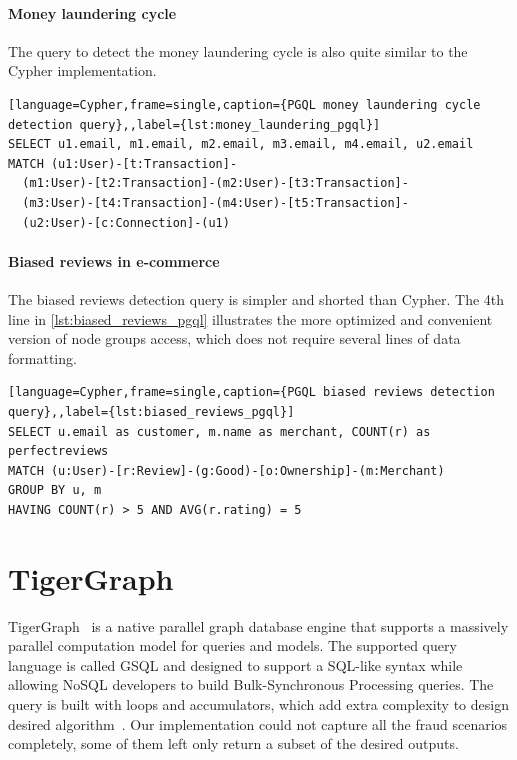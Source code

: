 \paragraph{Money laundering cycle}

The query to detect the money laundering cycle is also quite similar to the Cypher implementation.

\begin{lstlisting}[language=Cypher,frame=single,caption={PGQL money laundering cycle detection query},,label={lst:money_laundering_pgql}]
SELECT u1.email, m1.email, m2.email, m3.email, m4.email, u2.email
MATCH (u1:User)-[t:Transaction]-
  (m1:User)-[t2:Transaction]-(m2:User)-[t3:Transaction]-
  (m3:User)-[t4:Transaction]-(m4:User)-[t5:Transaction]-
  (u2:User)-[c:Connection]-(u1)
\end{lstlisting}

\paragraph{Biased reviews in e-commerce}

The biased reviews detection query is simpler and shorted than Cypher.
The 4th line in \autoref{lst:biased_reviews_pgql} illustrates the more optimized and convenient version of node groups access, which does not require several lines of data formatting.

\begin{lstlisting}[language=Cypher,frame=single,caption={PGQL biased reviews detection query},,label={lst:biased_reviews_pgql}]
SELECT u.email as customer, m.name as merchant, COUNT(r) as perfectreviews
MATCH (u:User)-[r:Review]-(g:Good)-[o:Ownership]-(m:Merchant)
GROUP BY u, m
HAVING COUNT(r) > 5 AND AVG(r.rating) = 5
\end{lstlisting}

\section{TigerGraph}\label{sec:static_tigergrap_implementation}

TigerGraph~\cite{tigergraph_website} is a native parallel graph database engine that supports a massively parallel computation model for queries and models.
The supported query language is called GSQL and designed to support a SQL-like syntax while allowing NoSQL developers to build Bulk-Synchronous Processing queries.
The query is built with loops and accumulators, which add extra complexity to design desired algorithm~\cite{DBLP:journals/corr/abs-1901-08248}.
Our implementation could not capture all the fraud scenarios completely, some of them left only return a subset of the desired outputs.


